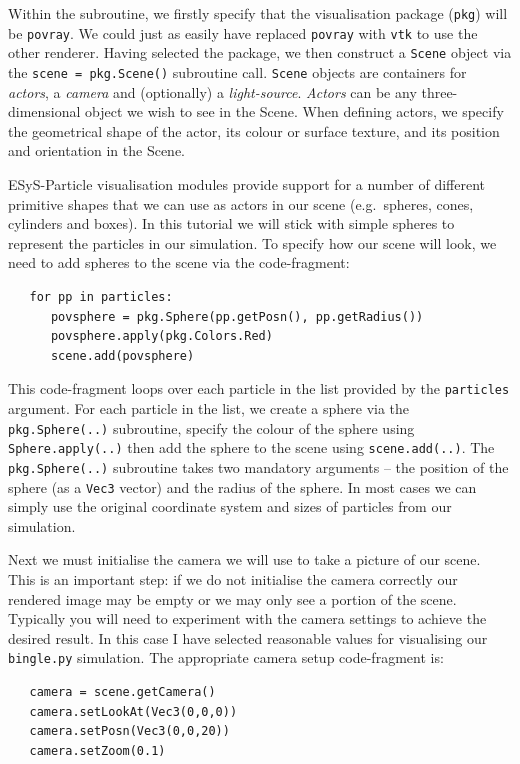 Within the subroutine, we firstly specify that the visualisation package (\texttt{pkg}) will be \texttt{povray}. We could just as easily have replaced \texttt{povray} with \texttt{vtk} to use the other renderer. Having selected the package, we then construct a \texttt{Scene} object via the \texttt{scene = pkg.Scene()} subroutine call. \texttt{Scene} objects are containers for \emph{actors}, a \emph{camera} and (optionally) a \emph{light-source}. \emph{Actors} can be any three-dimensional object we wish to see in the Scene. When defining actors, we specify the geometrical shape of the actor, its colour or surface texture, and its position and orientation in the Scene. 

ESyS-Particle visualisation modules provide support for a number of different primitive shapes that we can use as actors in our scene (e.g.\ spheres, cones, cylinders and boxes). In this tutorial we will stick with simple spheres to represent the particles in our simulation. To specify how our scene will look, we need to add spheres to the scene via the code-fragment:

\begin{verbatim}
   for pp in particles:
      povsphere = pkg.Sphere(pp.getPosn(), pp.getRadius())
      povsphere.apply(pkg.Colors.Red)
      scene.add(povsphere)
\end{verbatim}

\noindent
This code-fragment loops over each particle in the list provided by the \texttt{particles} argument. For each particle in the list, we create a sphere via the \texttt{pkg.Sphere(..)} subroutine, specify the colour of the sphere using \texttt{Sphere.apply(..)} then add the sphere to the scene using \texttt{scene.add(..)}. The \texttt{pkg.Sphere(..)} subroutine takes two mandatory arguments -- the position of the sphere (as a \texttt{Vec3} vector) and the radius of the sphere. In most cases we can simply use the original coordinate system and sizes of particles from our simulation. 

Next we must initialise the camera we will use to take a picture of our scene. This is an important step: if we do not initialise the camera correctly our rendered image may be empty or we may only see a portion of the scene. Typically you will need to experiment with the camera settings to achieve the desired result. In this case I have selected reasonable values for visualising our \texttt{bingle.py} simulation. The appropriate camera setup code-fragment is:

\begin{verbatim}
   camera = scene.getCamera()
   camera.setLookAt(Vec3(0,0,0))
   camera.setPosn(Vec3(0,0,20))
   camera.setZoom(0.1)
\end{verbatim}


